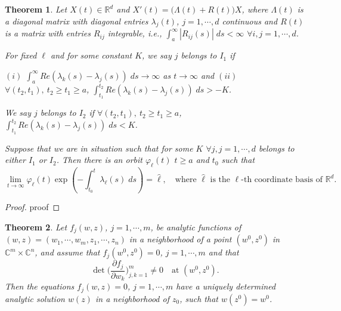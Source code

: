 \documentclass[a4paper,11pt]{article}
\def\blue{\color{blue}}
\newtheorem{theorem}{Theorem}
\theoremstyle{remark}
\begin{document}
\begin{theorem}{\cite[Diagonal Version]{CL1955}}\label{thm:CL} Let $X(t)\in \mathbb{R}^d$ and $X'(t) = \big(\Lambda(t) + R(t)\big)X$, where $\Lambda(t)$ is a diagonal matrix with diagonal entries $\lambda_j(t)$, $j=1,\cdots,d$ continuous and $R(t)$ is a matrix with entries $R_{ij}$ integrable, i.e., $\int_{a}^\infty |R_{ij}(s)|\; ds < \infty$ $\forall i,j=1,\cdots,d$. 

For fixed $\ell$ and for some constant $K$, we say $j$ belongs to $I_1$ if 

$(i)$ $\int_{a}^\infty Re(\lambda_k(s) -\lambda_j(s))\; ds \rightarrow \infty$ as $t \rightarrow \infty$ and $(ii)$ $\forall (t_2, t_1), \:t_2\ge t_1 \ge a$, $\int_{t_1}^{t_2} Re(\lambda_k(s) -\lambda_j(s))\; ds > -K$.

We say $j$ belongs to $I_2$ if $\forall (t_2, t_1), \: t_2\ge t_1 \ge a$, $\int_{t_1}^{t_2} Re(\lambda_k(s) -\lambda_j(s))\; ds < K$.

Suppose that we are in situation such that for some $K$ $\forall j, j=1,\cdots,d$ belongs to either $I_1$ or $I_2$. Then there is an orbit $\varphi_\ell(t)$ $t\ge a$ and $t_0$ such that
\begin{equation}
 \lim_{t \rightarrow \infty} \varphi_\ell(t) \exp\left(-\int_{t_0}^t \lambda_\ell(s)\; ds\right) = \hat{\ell}, \quad \text{where $\hat{\ell}$ is the $\ell$-th coordinate basis of $\mathbb{R}^d$.}
\end{equation}
\end{theorem}
\begin{proof}
{\blue proof}
\end{proof}

\begin{theorem}{\cite[p. 24]{L1966}} \label{thm:anal} Let $f_j(w,z)$, $j=1,\cdots,m$, be analytic functions of $(w,z)=(w_1,\cdots,w_m,z_1,\cdots,z_n)$ in a neighborhood of a point $(w^0,z^0)$ in $\mathbb{C}^m\times \mathbb{C}^n$, and assume that $f_j(w^0,z^0)=0$, $j=1,\cdots,m$ and that
$$ \det\Big( \frac{\partial f_j}{\partial w_k} \Big)_{j,k=1}^m \ne 0 \quad \text{at $(w^0,z^0)$}.$$
Then the equations $f_j(w,z)=0$, $j=1,\cdots,m$ have a uniquely determined analytic solution $w(z)$ in a neighborhood of $z_0$, such that $w(z^0)=w^0$.
\end{theorem}
\end{document}
